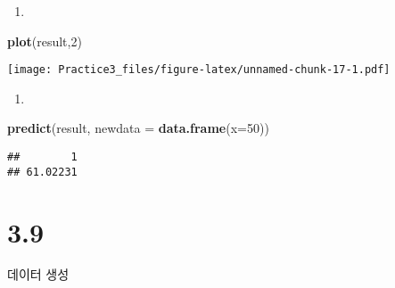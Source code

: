 \documentclass[
]{article}
\newenvironment{Shaded}{\begin{snugshade}}{\end{snugshade}}
\newcommand{\DataTypeTok}[1]{\textcolor[rgb]{0.13,0.29,0.53}{#1}}
\newcommand{\DecValTok}[1]{\textcolor[rgb]{0.00,0.00,0.81}{#1}}
\newcommand{\KeywordTok}[1]{\textcolor[rgb]{0.13,0.29,0.53}{\textbf{#1}}}
\newcommand{\NormalTok}[1]{#1}
\begin{document}
\begin{enumerate}
\def\labelenumi{(\alph{enumi})}
\setcounter{enumi}{9}
\item
\end{enumerate}

\begin{Shaded}
\begin{Highlighting}[]
\KeywordTok{plot}\NormalTok{(result,}\DecValTok{2}\NormalTok{)}
\end{Highlighting}
\end{Shaded}

\texttt{[image: Practice3\_files/figure-latex/unnamed-chunk-17-1.pdf]}

\begin{enumerate}
\def\labelenumi{(\alph{enumi})}
\setcounter{enumi}{10}
\item
\end{enumerate}

\begin{Shaded}
\begin{Highlighting}[]
\KeywordTok{predict}\NormalTok{(result, }\DataTypeTok{newdata =} \KeywordTok{data.frame}\NormalTok{(}\DataTypeTok{x=}\DecValTok{50}\NormalTok{))}
\end{Highlighting}
\end{Shaded}

\begin{verbatim}
##        1 
## 61.02231
\end{verbatim}

\hypertarget{section-1}{%
\section{3.9}\label{section-1}}

데이터 생성
\end{document}
